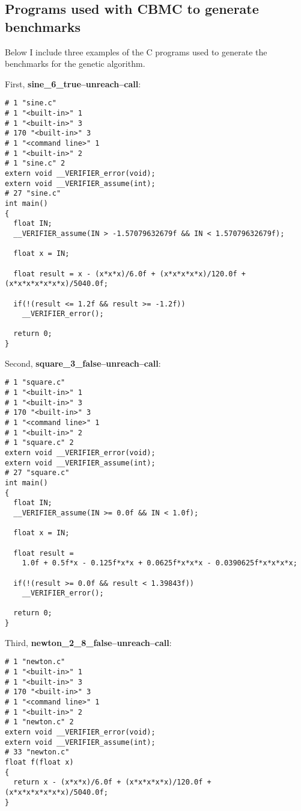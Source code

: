 \begin{appendices}
\section{Programs used with CBMC to generate benchmarks}

Below I include three examples of the C programs used to generate the benchmarks for the genetic algorithm.

\begin{samepage}
First, {\bf sine\_6\_true--unreach--call}:
\begin{lstlisting}[c]
# 1 "sine.c"
# 1 "<built-in>" 1
# 1 "<built-in>" 3
# 170 "<built-in>" 3
# 1 "<command line>" 1
# 1 "<built-in>" 2
# 1 "sine.c" 2
extern void __VERIFIER_error(void);
extern void __VERIFIER_assume(int);
# 27 "sine.c"
int main()
{
  float IN;
  __VERIFIER_assume(IN > -1.57079632679f && IN < 1.57079632679f);

  float x = IN;

  float result = x - (x*x*x)/6.0f + (x*x*x*x*x)/120.0f + (x*x*x*x*x*x*x)/5040.0f;

  if(!(result <= 1.2f && result >= -1.2f))
    __VERIFIER_error();

  return 0;
}
\end{lstlisting}
\end{samepage}

\begin{samepage}
Second, {\bf square\_3\_false--unreach--call}:
\begin{lstlisting}[c]
# 1 "square.c"
# 1 "<built-in>" 1
# 1 "<built-in>" 3
# 170 "<built-in>" 3
# 1 "<command line>" 1
# 1 "<built-in>" 2
# 1 "square.c" 2
extern void __VERIFIER_error(void);
extern void __VERIFIER_assume(int);
# 27 "square.c"
int main()
{
  float IN;
  __VERIFIER_assume(IN >= 0.0f && IN < 1.0f);

  float x = IN;

  float result =
    1.0f + 0.5f*x - 0.125f*x*x + 0.0625f*x*x*x - 0.0390625f*x*x*x*x;

  if(!(result >= 0.0f && result < 1.39843f))
    __VERIFIER_error();

  return 0;
}
\end{lstlisting}
\end{samepage}

\begin{samepage}
Third, {\bf newton\_2\_8\_false--unreach--call}:
\begin{lstlisting}[c]
# 1 "newton.c"
# 1 "<built-in>" 1
# 1 "<built-in>" 3
# 170 "<built-in>" 3
# 1 "<command line>" 1
# 1 "<built-in>" 2
# 1 "newton.c" 2
extern void __VERIFIER_error(void);
extern void __VERIFIER_assume(int);
# 33 "newton.c"
float f(float x)
{
  return x - (x*x*x)/6.0f + (x*x*x*x*x)/120.0f + (x*x*x*x*x*x*x)/5040.0f;
}


\end{lstlisting}
\end{samepage}
\end{appendices}
